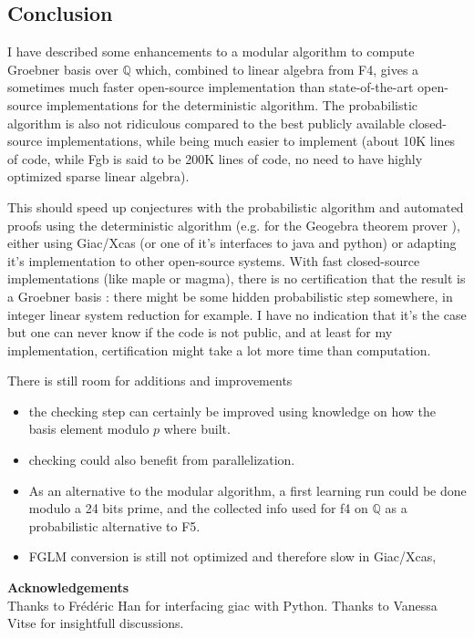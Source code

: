 \documentclass[a4paper,11pt]{article}
\newcommand{\Q}{{\mathbb{Q}}}
\begin{document}
\subsection{Conclusion}
I have described some enhancements to a modular algorithm
to compute Groebner basis over $\Q$ which, combined to 
linear algebra from F4, gives
a sometimes much faster open-source implementation 
than state-of-the-art open-source implementations 
for the deterministic algorithm. 
The probabilistic algorithm is also not ridiculous
compared to the best publicly available closed-source implementations,
while being much easier to implement
(about 10K lines of code, while Fgb is said to be 200K lines of code,
no need to have highly optimized sparse linear algebra).

This should speed up conjectures with the probabilistic algorithm
and automated proofs using the deterministic
algorithm (e.g. for the Geogebra theorem prover
\cite{botanaimplementing}), 
either using Giac/Xcas (or one of it's interfaces
to java and python) or adapting it's implementation
to other open-source systems.
With fast closed-source implementations (like maple or magma), 
there is no certification that the result is a Groebner basis :
there might be some hidden probabilistic
step somewhere, in integer linear system reduction for example. I have
no indication that it's the case but one can never know if the code is
not public, and at least for my implementation, certification
might take a lot more time than computation. 

There is still room for additions and improvements
\begin{itemize}
\item the checking step can certainly be improved using
knowledge on how the basis element modulo $p$ where
built.
\item checking could also benefit from parallelization.
\item As an alternative to the modular algorithm,
a first learning run could be done modulo a 24 bits prime, and
the collected info used for f4 on $\Q$ as a probabilistic alternative
to F5.
\item FGLM conversion is still not optimized and therefore
slow in Giac/Xcas, 
\end{itemize}


{\bf Acknowledgements} \\
Thanks to Fr\'ed\'eric Han for interfacing giac with Python.
Thanks to Vanessa Vitse for insightfull discussions.
\end{document}
